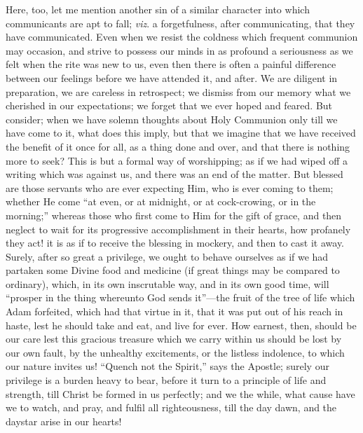 Here, too, let me mention another sin of a similar character into
which communicants are apt to fall; \emph{viz}. a forgetfulness, after
communicating, that they have communicated. Even when we resist the
coldness which frequent communion may occasion, and strive to possess
our minds in as profound a seriousness as we felt when the rite was
new to us, even then there is often a painful difference between our
feelings before we have attended it, and after. We are diligent in
preparation, we are careless in retrospect; we dismiss from our memory
what we cherished in our expectations; we forget that we ever hoped
and feared. But consider; when we have solemn thoughts about Holy
Communion only till we have come to it, what does this imply, but that
we imagine that we have received the benefit of it once for all, as a
thing done and over, and that there is nothing more to seek? This is
but a formal way of worshipping; as if we had wiped off a writing
which was against us, and there was an end of the matter. But blessed
are those servants who are ever expecting Him, who is ever coming to
them; whether He come ``at even, or at midnight, or at
cock-crowing, or in the morning;'' whereas those who first come to
Him for the gift of grace, and then neglect to wait for its progressive accomplishment in their hearts, how profanely they act! it
is as if to receive the blessing in mockery, and then to cast it away.
Surely, after so great a privilege, we ought to behave ourselves as if
we had partaken some Divine food and medicine (if great things may be
compared to ordinary), which, in its own inscrutable way, and in its
own good time, will ``prosper in the thing whereunto God sends
it''—the fruit of the tree of life which Adam forfeited, which
had that virtue in it, that it was put out of his reach in haste, lest
he should take and eat, and live for ever. How earnest, then, should
be our care lest this gracious treasure which we carry within us
should be lost by our own fault, by the unhealthy excitements, or the
listless indolence, to which our nature invites us! ``Quench not
the Spirit,'' says the Apostle; surely our privilege is a burden
heavy to bear, before it turn to a principle of life and strength,
till Christ be formed in us perfectly; and we the while, what cause
have we to watch, and pray, and fulfil all righteousness, till the day
dawn, and the daystar arise in our hearts!

